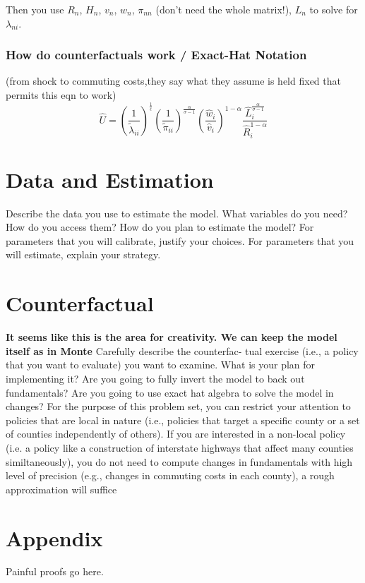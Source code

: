 \documentclass{article}
\begin{document}
Then you use $R_n$, $H_n$, $v_n$, $w_n$,  $\pi_{nn}$ (don't need the whole matrix!), $L_n$
to solve for $\lambda_{ni}$.
\subsubsection{How do counterfactuals work / Exact-Hat Notation }


(from shock to commuting costs,they say what they assume is held fixed that permits this eqn to work)
\begin{equation}
\hat{U} = \left(\frac{1}{\tilde{\lambda}_{ii}}\right)^{\frac{1}{\epsilon}} \left(\frac{1}{\tilde{\pi}_{ii}}\right)^{\frac{\alpha}{\sigma-1}} \left(\frac{\hat{w}_i}{\hat{v}_i}\right)^{1-\alpha} \frac{\hat{L}_i^{\frac{\alpha}{\sigma-1}}}{\hat{R}_i^{1-\alpha}}
\end{equation}

\section{Data and Estimation}
\label{sec:data}
Describe the data you use to estimate the model. What
variables do you need? How do you access them? How do you plan to estimate the
model? For parameters that you will calibrate, justify your choices. For parameters
that you will estimate, explain your strategy.

\section{Counterfactual}
\textbf{It seems like this is the area for creativity. We can keep the model itself as in Monte}
\label{sec:counterfactual}
Carefully describe the counterfac-
tual exercise (i.e., a policy that you want to evaluate) you want to examine. What is your plan for implementing it? Are you going to fully invert the model to back out
fundamentals? Are you going to use exact hat algebra to solve the model in changes?
For the purpose of this problem set, you can restrict your attention to policies that
are local in nature (i.e., policies that target a specific county or a set of counties
independently of others). If you are interested in a non-local policy (i.e. a policy like a
construction of interstate highways that affect many counties similtaneously), you do
not need to compute changes in fundamentals with high level of precision (e.g., changes
in commuting costs in each county), a rough approximation will suffice

\section{Appendix}
Painful proofs go here.


\end{document}
